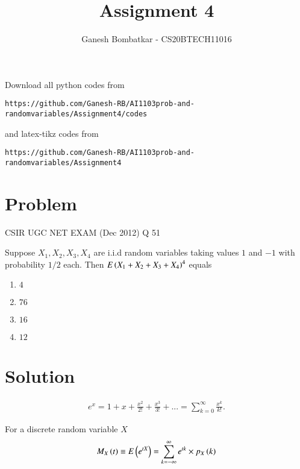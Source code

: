 \documentclass[journal,12pt,twocolumn]{IEEEtran}
\begin{document}
     \def\rightbox#1{\makebox[0in][r]{#1}}
     \def\centbox#1{\makebox[0in]{#1}}
     \def\topbox#1{\raisebox{-\baselineskip}[0in][0in]{#1}}
     \def\midbox#1{\raisebox{-0.5\baselineskip}[0in][0in]{#1}}
\vspace{3cm}
\title{Assignment 4}
\author{Ganesh Bombatkar - CS20BTECH11016}
\maketitle
\newpage
\bigskip
\renewcommand{\thefigure}{\theenumi}
\renewcommand{\thetable}{\theenumi}
Download all python codes from 
\begin{lstlisting}
https://github.com/Ganesh-RB/AI1103prob-and-randomvariables/Assignment4/codes
\end{lstlisting}
%
and latex-tikz codes from 
%
\begin{lstlisting}
https://github.com/Ganesh-RB/AI1103prob-and-randomvariables/Assignment4
\end{lstlisting}

\section{Problem}
{
\centering CSIR UGC NET EXAM (Dec 2012) Q 51

}
Suppose $X_1,X_2,X_3,X_4$ are i.i.d random variables taking values $1$ and $-1$ with probability $1/2$ each. Then $E\left(X_1+X_2 +X_3 +X_4\right)^4$ equals
\begin{multicols}{4}
\begin{enumerate}
    \item $4$
    \item $76$
    \item $16$
    \item $12$
\end{enumerate}
\end{multicols}

\section{Solution}
\begin{definition}
\begin{align}
e^x=1+x+\frac{x^2}{2!}+\frac{x^3}{3!}+...=\sum_{k=0}^{\infty} \frac{x^k}{k!}.
\end{align}
\end{definition}

\begin{definition}
    For a discrete random variable $X$  
    \begin{align}
        M_{X}\left(t\right) \equiv E\left(e^{t X}\right) = \sum_{k=-\infty}^{\infty} e^{t k}\times p_X\left(k\right)
    \end{align}
\end{definition}
\end{document}
